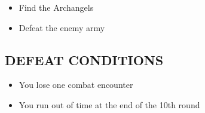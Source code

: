 \begin{multicols*}{2}
\begin{itemize}
  \item Find the Archangels
  \item Defeat the enemy army
\end{itemize}


\subsection*{\MakeUppercase{Defeat Conditions}}
\begin{itemize}
  \item You lose one combat encounter
  \item You run out of time at the end of the 10th round
\end{itemize}

\end{multicols*}

\newpage

